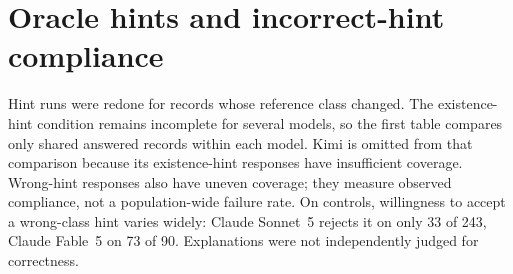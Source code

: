 \documentclass{article}
\begin{document}
\section{Oracle hints and incorrect-hint compliance}
\label{sec:hints}
\begin{table}[h]\centering\small
{}
\caption{Blind detection, an error-existence hint, and a class hint, on each
model's shared answered records ($n$); $\dagger$ marks incomplete coverage.
Both hints disclose the binary label.
Class-set agreement includes controls; pooled class recall uses reference
labels in the Lean-semantics group (Section~\ref{sec:eval}). Different row populations preclude
interpreting this as a model ranking.}
\end{table}
\begin{table}[h]\centering\small
{}
\caption{Wrong-hint control. Each record receives a class absent from its
reference label set. Denominators reflect available responses. Correct-hint
agreement can coexist with acceptance of incorrect labels.}
\end{table}
Hint runs were redone for records whose reference class changed. The
existence-hint condition remains incomplete for several models, so the first
table compares only shared answered records within each model. Kimi is omitted
from that comparison because its existence-hint responses have insufficient
coverage. Wrong-hint responses also have uneven coverage; they measure observed
compliance, not a population-wide failure rate. On controls, willingness to
accept a wrong-class hint varies widely: Claude Sonnet~5 rejects it on only
33 of 243, Claude Fable~5 on 73 of 90. Explanations were not independently
judged for correctness.
\end{document}
